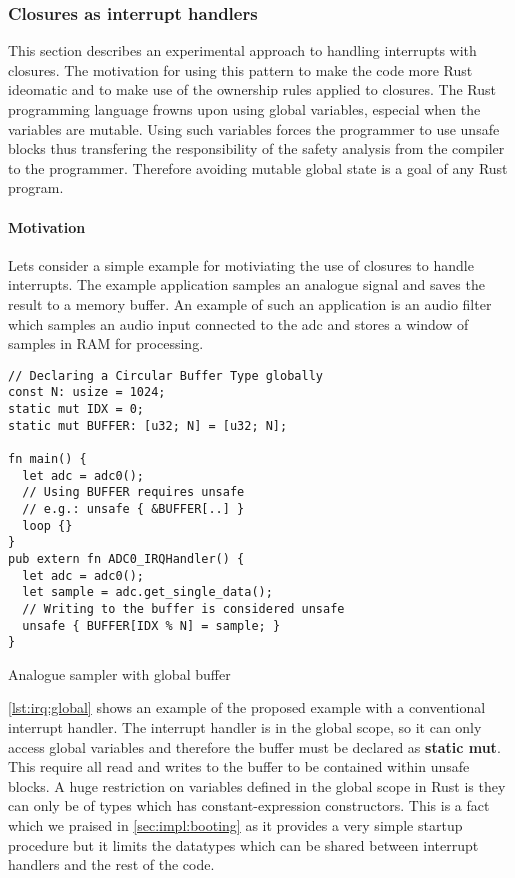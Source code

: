 \subsubsection{Closures as interrupt handlers}
\label{sec:irq-closures}

This section describes an experimental approach to handling interrupts with closures.
The motivation for using this pattern to make the code more Rust ideomatic and to make use of the ownership rules applied to closures.
The Rust programming language frowns upon using global variables, especial when the variables are mutable.
Using such variables forces the programmer to use unsafe blocks thus transfering the responsibility of the safety analysis from the compiler to the programmer.
Therefore avoiding mutable global state is a goal of any Rust program.

\paragraph{Motivation}
\label{par:irq:motivation}

Lets consider a simple example for motiviating the use of closures to handle interrupts.
The example application samples an analogue signal and saves the result to a memory buffer.
An example of such an application is an audio filter which samples an audio input connected to the \gls{adc} and stores a window of samples in RAM for processing.

\begin{listing}[H]
  \begin{verbatim}
// Declaring a Circular Buffer Type globally
const N: usize = 1024;
static mut IDX = 0;
static mut BUFFER: [u32; N] = [u32; N];

fn main() {
  let adc = adc0();
  // Using BUFFER requires unsafe
  // e.g.: unsafe { &BUFFER[..] }
  loop {}
}
pub extern fn ADC0_IRQHandler() {
  let adc = adc0();
  let sample = adc.get_single_data();
  // Writing to the buffer is considered unsafe
  unsafe { BUFFER[IDX % N] = sample; }
}
  \end{verbatim}
  \caption{Analogue sampler with global buffer}
  \label{lst:irq:global}
\end{listing}

\autoref{lst:irq:global} shows an example of the proposed example with a conventional interrupt handler.
The interrupt handler is in the global scope, so it can only access global variables and therefore the buffer must be declared as \textbf{static mut}.
This require all read and writes to the buffer to be contained within unsafe blocks.
A huge restriction on variables defined in the global scope in Rust is they can only be of types which has constant-expression constructors.
This is a fact which we praised in \autoref{sec:impl:booting} as it provides a very simple startup procedure but it limits the datatypes which can be shared between interrupt handlers and the rest of the code.


